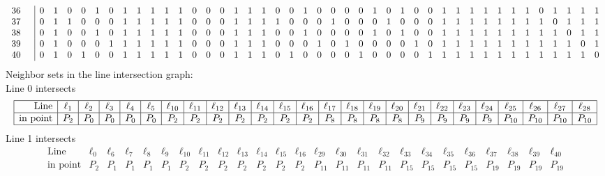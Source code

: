 \documentclass{article}
\begin{document}
{{$$\begin{array}{rr|*{41}r}
36 &  & 0 & 1 & 0 & 0 & 1 & 0 & 1 & 1 & 1 & 1 & 1 & 0 & 0 & 0 & 1 & 1 & 1 & 0 & 0 & 1 & 0 & 0 & 0 & 0 & 1 & 0 & 1 & 0 & 0 & 1 & 1 & 1 & 1 & 1 & 1 & 1 & 0 & 1 & 1 & 1 & 1\\
37 &  & 0 & 1 & 1 & 0 & 0 & 0 & 1 & 1 & 1 & 1 & 1 & 0 & 0 & 0 & 1 & 1 & 1 & 1 & 0 & 0 & 0 & 1 & 0 & 0 & 0 & 1 & 0 & 0 & 0 & 1 & 1 & 1 & 1 & 1 & 1 & 1 & 1 & 0 & 1 & 1 & 1\\
38 &  & 0 & 1 & 0 & 0 & 1 & 0 & 1 & 1 & 1 & 1 & 1 & 0 & 0 & 0 & 1 & 1 & 1 & 0 & 0 & 1 & 0 & 0 & 0 & 0 & 1 & 0 & 1 & 0 & 0 & 1 & 1 & 1 & 1 & 1 & 1 & 1 & 1 & 1 & 0 & 1 & 1\\
39 &  & 0 & 1 & 0 & 0 & 0 & 1 & 1 & 1 & 1 & 1 & 1 & 0 & 0 & 0 & 1 & 1 & 1 & 0 & 0 & 0 & 1 & 0 & 1 & 0 & 0 & 0 & 0 & 1 & 0 & 1 & 1 & 1 & 1 & 1 & 1 & 1 & 1 & 1 & 1 & 0 & 1\\
40 &  & 0 & 1 & 0 & 1 & 0 & 0 & 1 & 1 & 1 & 1 & 1 & 0 & 0 & 0 & 1 & 1 & 1 & 0 & 1 & 0 & 0 & 0 & 0 & 1 & 0 & 0 & 0 & 0 & 1 & 1 & 1 & 1 & 1 & 1 & 1 & 1 & 1 & 1 & 1 & 1 & 0\\
\end{array}
$$
}%
Neighbor sets in the line intersection graph:\\
Line 0 intersects 
$$
\begin{array}{|r*{24}{|c}|}
\hline
\mbox{Line}  & \ell_{1} & \ell_{2} & \ell_{3} & \ell_{4} & \ell_{5} & \ell_{10} & \ell_{11} & \ell_{12} & \ell_{13} & \ell_{14} & \ell_{15} & \ell_{16} & \ell_{17} & \ell_{18} & \ell_{19} & \ell_{20} & \ell_{21} & \ell_{22} & \ell_{23} & \ell_{24} & \ell_{25} & \ell_{26} & \ell_{27} & \ell_{28}\\
\hline
\mbox{in point}  & P_{2} & P_{0} & P_{0} & P_{0} & P_{0} & P_{2} & P_{2} & P_{2} & P_{2} & P_{2} & P_{2} & P_{2} & P_{8} & P_{8} & P_{8} & P_{8} & P_{9} & P_{9} & P_{9} & P_{9} & P_{10} & P_{10} & P_{10} & P_{10}\\
\hline
\end{array}
$$
Line 1 intersects 
$$
\begin{array}{|r*{24}{|c}|}
\hline
\mbox{Line}  & \ell_{0} & \ell_{6} & \ell_{7} & \ell_{8} & \ell_{9} & \ell_{10} & \ell_{11} & \ell_{12} & \ell_{13} & \ell_{14} & \ell_{15} & \ell_{16} & \ell_{29} & \ell_{30} & \ell_{31} & \ell_{32} & \ell_{33} & \ell_{34} & \ell_{35} & \ell_{36} & \ell_{37} & \ell_{38} & \ell_{39} & \ell_{40}\\
\hline
\mbox{in point}  & P_{2} & P_{1} & P_{1} & P_{1} & P_{1} & P_{2} & P_{2} & P_{2} & P_{2} & P_{2} & P_{2} & P_{2} & P_{11} & P_{11} & P_{11} & P_{11} & P_{15} & P_{15} & P_{15} & P_{15} & P_{19} & P_{19} & P_{19} & P_{19}\\

\end{array}$$}
\end{document}
